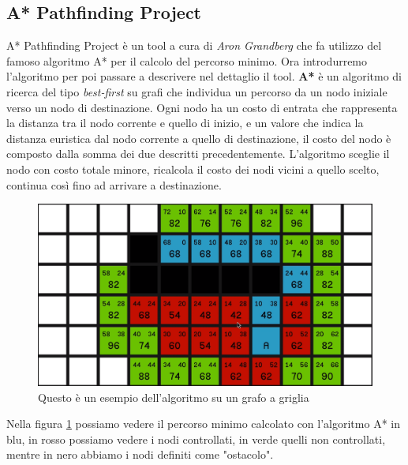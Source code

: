 \documentclass[12pt, openany]{book}
\begin{document}
	\subsection{A* Pathfinding Project}
		A* Pathfinding Project \cite{A*} è un tool a cura di \emph{Aron Grandberg} che fa utilizzo del famoso algoritmo A* per il calcolo del percorso minimo.
		Ora introdurremo l'algoritmo per poi passare a descrivere nel dettaglio il tool.
		\textbf{A*} è un algoritmo di ricerca del tipo \emph{best-first} su grafi che individua un percorso da un nodo iniziale verso un nodo di destinazione. Ogni nodo ha un costo di entrata che rappresenta la distanza tra il nodo corrente e quello di inizio, e un valore che indica la distanza euristica dal nodo corrente a quello di destinazione, il costo del nodo è composto dalla somma dei due descritti precedentemente. L'algoritmo sceglie il nodo con costo totale minore, ricalcola il costo dei nodi vicini a quello scelto, continua così fino ad arrivare a destinazione.
		\begin{figure}[H]
			\centering
			\includegraphics[width=1\linewidth]{"Immagini/AStar"}
			\caption{Questo è un esempio dell'algoritmo su un grafo a griglia}
			\label{fig:AStar}
		\end{figure}
		Nella figura \ref{fig:AStar} possiamo vedere il percorso minimo calcolato con l'algoritmo A* in blu, in rosso possiamo vedere i nodi controllati, in verde quelli non controllati, mentre in nero abbiamo i nodi definiti come "ostacolo". 
\end{document}
